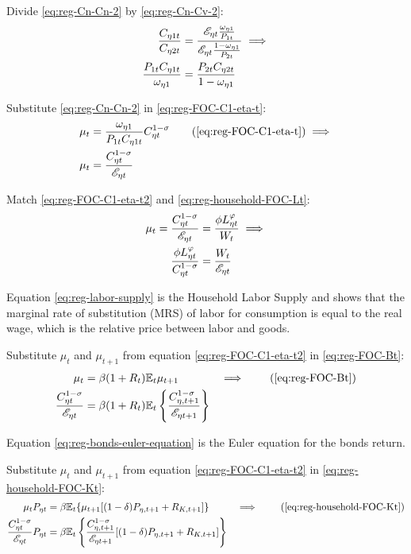 \documentclass[../thesis.tex]{subfiles}
\begin{document}
\begin{tcolorbox}[colback=red!5!white,colframe=red!75!black]

Divide \ref{eq:reg-Cn-Cn-2} by \ref{eq:reg-Cn-Cv-2}:
\begin{align}
	\frac{C_{\eta 1 t}}{C_{\eta 2 t}} &= \frac{{\mathscr{E}_{\eta t}} \frac{\omega_{\eta 1}}{P_{1 t}}}{{\mathscr{E}_{\eta t}} \frac{1 -\omega_{\eta 1}}{P_{2 t}}} \implies \nonumber \\
	\frac{P_{1 t} C_{\eta 1 t}}{\omega_{\eta 1}} &= \frac{P_{2 t} C_{\eta 2 t}}{1 -\omega_{\eta 1}} \label{eq:reg-Cn1-Cn2}
\end{align}

\end{tcolorbox}

Substitute \ref{eq:reg-Cn-Cn-2} in \ref{eq:reg-FOC-C1-eta-t}:
\begin{align}
	\mu_t &= \frac{\omega_{\eta 1}}{P_{1 t} C_{\eta 1 t}} C_{\eta t}^{1 -\sigma} \tag{\ref{eq:reg-FOC-C1-eta-t}} \implies \\
	\mu_t &= \frac{ C_{\eta t}^{1-\sigma}}{ \te}  \label{eq:reg-FOC-C1-eta-t2}
\end{align}

Match \ref{eq:reg-FOC-C1-eta-t2} and \ref{eq:reg-household-FOC-Lt}:
\begin{align}
	\mu_t = \frac{ C_{\eta t}^{1-\sigma}}{ {\mathscr{E}_{\eta t}}} &= \frac{\phi L_{\eta t}^{\varphi}}{W_t} \implies \nonumber \\
	\frac{\phi L_{\eta t}^{\varphi}}{C_{\eta t}^{1-\sigma}} &= \frac{W_t}{{\mathscr{E}_{\eta t}}} \label{eq:reg-labor-supply}
\end{align}

Equation \ref{eq:reg-labor-supply} is the Household Labor Supply and shows that the marginal rate of substitution (MRS) of labor for consumption is equal to the real wage, which is the relative price between labor and goods.

Substitute $\mu_t$ and $\mu_{t+1}$ from equation \ref{eq:reg-FOC-C1-eta-t2} in \ref{eq:reg-FOC-Bt}:
\begin{alignat}{2}
	\mu_t &= \beta (1 + R_{t}) \E{ \mu_{t+1}} &\implies \tag{\ref{eq:reg-FOC-Bt}} 
	\\
	\frac{ C_{\eta t}^{1-\sigma}}{ \te} &= \beta (1 + R_{t}) \E \left\{ \frac{ C_{\eta, t+1}^{1-\sigma}}{ \te[t+1]} \right\} \label{eq:reg-bonds-euler-equation}
\end{alignat}

Equation \ref{eq:reg-bonds-euler-equation} is the Euler equation for the bonds return.

Substitute $\mu_t$ and $\mu_{t+1}$ from equation \ref{eq:reg-FOC-C1-eta-t2} in \ref{eq:reg-household-FOC-Kt}:
\begin{alignat}{2}
	\mu_t P_{\eta t} &= \beta \mathbb{E}_t \{ \mu_{t+1} [(1-\delta) P_{\eta, t+1} + R_{K,t+1}] \} &\implies \tag{\ref{eq:reg-household-FOC-Kt}} 
	\\
	\frac{ C_{\eta t}^{1-\sigma}}{ \te} P_{\eta t} &= \beta \mathbb{E}_t \left\{ \frac{ C_{\eta, t+1}^{1-\sigma}}{ \te[t+1]} [(1-\delta) P_{\eta, t+1} + R_{K,t+1}] \right\} \label{eq:reg-capital-euler-equation}
\end{alignat}
\end{document}
